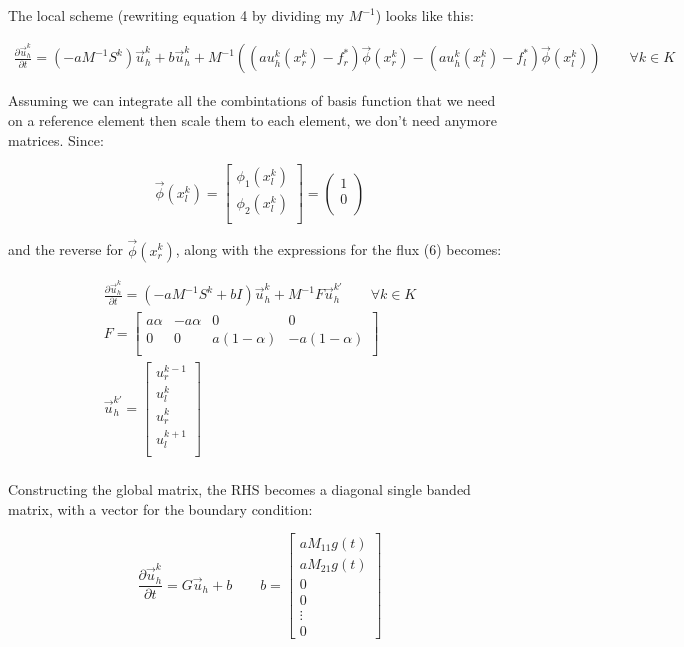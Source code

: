 \documentclass{article}
\begin{document}
The local scheme (rewriting equation 4 by dividing my $M^{-1}$) looks like this:

\begin{gather}
  \frac{\partial\vec{u}_h^k}{\partial t} =  (-a M^{-1} S^k) \vec{u}_h^k + b\vec{u}_h^k +  M^{-1}((au_h^k(x_r^k) - f^*_r)\vec{\phi}(x_r^k) - (au_h^k(x_l^k) - f^*_l)\vec{\phi}(x_l^k))\qquad \forall k \in K
  \end{gather}

Assuming we can integrate all the combintations of basis function that we need on a reference element then scale them to each element, we don't need anymore matrices. Since:

$$
\vec{\phi}(x_l^k) =
\begin{bmatrix}
  \phi_1(x_l^k) \\
  \phi_2(x_l^k) \\
\end{bmatrix}
= \begin{pmatrix}
  1 \\
  0 \\
\end{pmatrix}
$$

and the reverse for $\vec{\phi}(x_r^k)$, along with the expressions for the flux (6) becomes:

\begin{gather*}
\frac{\partial\vec{u}_h^k}{\partial t} =  (-a M^{-1} S^k +bI) \vec{u}_h^k +  M^{-1}F\vec{u}_h^{k{\prime}}
\qquad \forall k \in K \\
F = \begin{bmatrix}
  a\alpha & -a\alpha & 0 & 0 \\
  0 & 0 & a(1-\alpha) & -a(1-\alpha) \\
\end{bmatrix}\\
\vec{u}_h^{k\prime}=
\begin{bmatrix}
  u_r^{k-1} \\
  u_l^k \\
  u_r^k \\
  u_l^{k+1} \\
\end{bmatrix}\\
\end{gather*}

Constructing the global matrix, the RHS becomes a diagonal single banded matrix, with a vector for the boundary condition:

$$\frac{\partial\vec{u}_h^k}{\partial t} = G\vec{u}_h + b\qquad b = \begin{bmatrix} aM_{11}g(t)\\  aM_{21}g(t) \\ 0 \\ 0\\ \vdots \\ 0 \end{bmatrix}$$
\end{document}
